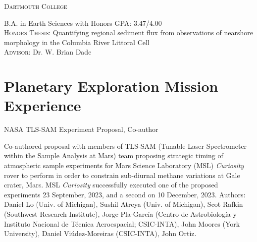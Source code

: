 \documentclass[11pt, letterpaper]{article}
\newcommand{\years}[1]{\marginnote{\scriptsize #1}}
\begin{document}
\years{2015}\textsc{Dartmouth College}

    \textsc{B.A.} in Earth Sciences with Honors \hfill GPA: 3.47/4.00\\
    \textsc{Honors Thesis:} Quantifying regional sediment flux from
    observations of nearshore morphology in the Columbia River Littoral Cell\\
    \textsc{Advisor:} Dr. W. Brian Dade


%
%
%

\section*{Planetary Exploration Mission Experience}
\label{sec:missions}  %
\noindent
\years{2023}NASA TLS-SAM Experiment Proposal, Co-author

    Co-authored proposal with members of TLS-SAM (Tunable Laser Spectrometer
    within the Sample Analysis at Mars) team proposing strategic timing of
    atmospheric sample experiments for Mars Science Laboratory (MSL)
    \textit{Curiosity} rover to perform in order to constrain sub-diurnal
    methane variations at Gale crater, Mars. MSL \textit{Curiosity}
    successfully executed one of the proposed experiments 23 September, 2023,
    and a second on 10 December, 2023. Authors: Daniel Lo (Univ. of Michigan),
    Sushil Atreya (Univ. of Michigan), Scot Rafkin (Southwest Research
    Institute), Jorge Pla-Garc\'{i}a (Centro de Astrobiolog\'{i}a y Instituto Nacional de T\'{e}cnica Aeroespacial; CSIC-INTA),
    John Moores (York University), Daniel Vi\'{u}dez-Moreiras (CSIC-INTA), John
    Ortiz.
\end{document}
